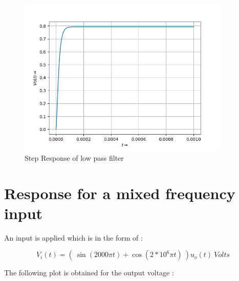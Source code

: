 \documentclass[10pt,a4paper]{article}
\begin{document}
\begin{figure}[!tbh]

\includegraphics[width = 0.9\textwidth]{low pass filter step response.png}
\caption{Step Response of low pass filter}

\end{figure}

\section{Response for a mixed frequency input}

An input is applied which is in the form of : 

\begin{equation*}
  V_{i}(t) = ( \ \sin(2000\pi t) + \cos(2*10^{6}\pi t) \ )u_{o}(t) \ Volts
\end{equation*}

The following plot is obtained for the output voltage : \\ \\ \\ \\ \\ \\ \\ \\ \\ \\ \\ \\ \\ \\ \\ \\ \\ \\ \\ \\ \\ \\ \\ \\ \\ \\ 
\end{document}
